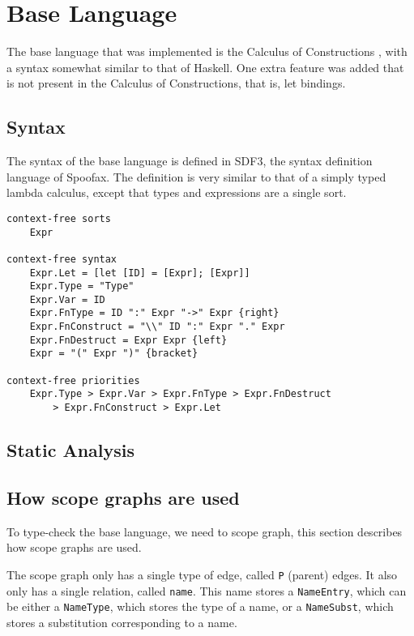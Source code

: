 
\chapter{\label{chap:baselang}Base Language}

The base language that was implemented is the Calculus of Constructions \autocite{Coquand_Huet_1988}, with a syntax somewhat similar to that of Haskell. One extra feature was added that is not present in the Calculus of Constructions, that is, let bindings.

\section{Syntax}

The syntax of the base language is defined in SDF3, the syntax definition language of Spoofax. The definition is very similar to that of a simply typed lambda calculus, except that types and expressions are a single sort. 

\begin{lstlisting}
context-free sorts
	Expr
	
context-free syntax
	Expr.Let = [let [ID] = [Expr]; [Expr]]
	Expr.Type = "Type"
	Expr.Var = ID
	Expr.FnType = ID ":" Expr "->" Expr {right}
	Expr.FnConstruct = "\\" ID ":" Expr "." Expr
	Expr.FnDestruct = Expr Expr {left}
	Expr = "(" Expr ")" {bracket}

context-free priorities
	Expr.Type > Expr.Var > Expr.FnType > Expr.FnDestruct 
		> Expr.FnConstruct > Expr.Let
\end{lstlisting}

\section{Static Analysis}


\section{How scope graphs are used}

To type-check the base language, we need to scope graph, this section describes how scope graphs are used.

The scope graph only has a single type of edge, called \verb|P| (parent) edges. It also only has a single relation, called \verb|name|. This name stores a \verb|NameEntry|, which can be either a \verb|NameType|, which stores the type of a name, or a \verb|NameSubst|, which stores a substitution corresponding to a name. 

